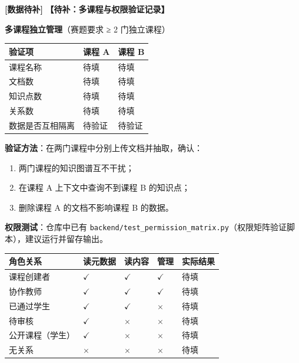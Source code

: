 \documentclass[UTF8,a4paper,11pt]{ctexrep}
\newcommand{\todomark}{\textcolor{todobar}{\textbf{[数据待补]}}}
\begin{document}
\begin{todobox}
\todomark{} \textbf{【待补：多课程与权限验证记录】}

\textbf{多课程独立管理}（赛题要求 ≥ 2 门独立课程）

\begin{center}
\small
\begin{tabularx}{\linewidth}{@{}XXX@{}}
\toprule
验证项 & 课程 A & 课程 B \\
\midrule
课程名称 & 待填 & 待填 \\
文档数 & 待填 & 待填 \\
知识点数 & 待填 & 待填 \\
关系数 & 待填 & 待填 \\
数据是否互相隔离 & 待验证 & 待验证 \\
\bottomrule
\end{tabularx}
\end{center}
\textbf{验证方法}：在两门课程中分别上传文档并抽取，确认：

\begin{enumerate}
\item 两门课程的知识图谱互不干扰；
\item 在课程 A 上下文中查询不到课程 B 的知识点；
\item 删除课程 A 的文档不影响课程 B 的数据。
\end{enumerate}
\textbf{权限测试}：仓库中已有 \texttt{backend/test\_permission\_matrix.py}（权限矩阵验证脚本），建议运行并留存输出。

\begin{center}
\footnotesize
\begin{tabularx}{\linewidth}{@{}XXXXX@{}}
\toprule
角色关系 & 读元数据 & 读内容 & 管理 & 实际结果 \\
\midrule
课程创建者 & $\checkmark$ & $\checkmark$ & $\checkmark$ & 待填 \\
协作教师 & $\checkmark$ & $\checkmark$ & $\checkmark$ & 待填 \\
已通过学生 & $\checkmark$ & $\checkmark$ & $\times$ & 待填 \\
待审核 & $\checkmark$ & $\times$ & $\times$ & 待填 \\
公开课程（学生） & $\checkmark$ & $\times$ & $\times$ & 待填 \\
无关系 & $\times$ & $\times$ & $\times$ & 待填 \\
\bottomrule
\end{tabularx}
\end{center}
\end{todobox}
\end{document}
